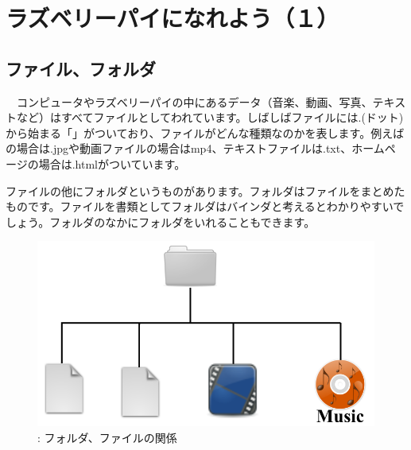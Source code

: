 \documentclass[a4paper,12pt]{jarticle}
\begin{document}
\section{ラズベリーパイになれよう（１）}
\subsection{ファイル、フォルダ}
\ \ コンピュータやラズベリーパイの中にあるデータ（音楽、動画、写真、テキストなど）はすべてファイルとしてわれています。しばしばファイルには.(ドット)から始まる「」がついており、ファイルがどんな種類なのかを表します。例えばの場合は.jpgや動画ファイルの場合はmp4、テキストファイルは.txt、ホームページの場合は.htmlがついています。

ファイルの他にフォルダというものがあります。フォルダはファイルをまとめたものです。ファイルを書類としてフォルダはバインダと考えるとわかりやすいでしょう。フォルダのなかにフォルダをいれることもできます。



\begin{figure}[hb]
  \centering
  \begin{minipage}{13.148cm}


    \includegraphics[width=13.148cm]{figure15.png}
    {\upshape
      \newline
      :
      フォルダ、ファイルの関係}
  \end{minipage}
\end{figure}
\end{document}
